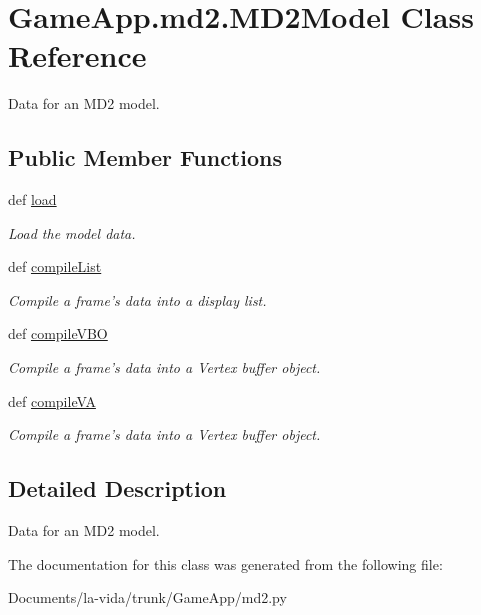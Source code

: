 \hypertarget{classGameApp_1_1md2_1_1MD2Model}{
\section{GameApp.md2.MD2Model Class Reference}
\label{classGameApp_1_1md2_1_1MD2Model}
}
Data for an MD2 model.  


\subsection*{Public Member Functions}
\begin{CompactItemize}
\item 
\hypertarget{classGameApp_1_1md2_1_1MD2Model_d5424ec6f9096eec0f6a65f6b200890d}{
def \hyperlink{classGameApp_1_1md2_1_1MD2Model_d5424ec6f9096eec0f6a65f6b200890d}{load}}
\label{classGameApp_1_1md2_1_1MD2Model_d5424ec6f9096eec0f6a65f6b200890d}

\begin{CompactList}\small\item\em Load the model data. \item\end{CompactList}\item 
\hypertarget{classGameApp_1_1md2_1_1MD2Model_42826a5b1300b880e0676003158ebd44}{
def \hyperlink{classGameApp_1_1md2_1_1MD2Model_42826a5b1300b880e0676003158ebd44}{compileList}}
\label{classGameApp_1_1md2_1_1MD2Model_42826a5b1300b880e0676003158ebd44}

\begin{CompactList}\small\item\em Compile a frame's data into a display list. \item\end{CompactList}\item 
\hypertarget{classGameApp_1_1md2_1_1MD2Model_6e52ed170fd7707c3ad8c5228f9127fb}{
def \hyperlink{classGameApp_1_1md2_1_1MD2Model_6e52ed170fd7707c3ad8c5228f9127fb}{compileVBO}}
\label{classGameApp_1_1md2_1_1MD2Model_6e52ed170fd7707c3ad8c5228f9127fb}

\begin{CompactList}\small\item\em Compile a frame's data into a Vertex buffer object. \item\end{CompactList}\item 
\hypertarget{classGameApp_1_1md2_1_1MD2Model_cc0ea2f6403496a1742472528bafb773}{
def \hyperlink{classGameApp_1_1md2_1_1MD2Model_cc0ea2f6403496a1742472528bafb773}{compileVA}}
\label{classGameApp_1_1md2_1_1MD2Model_cc0ea2f6403496a1742472528bafb773}

\begin{CompactList}\small\item\em Compile a frame's data into a Vertex buffer object. \item\end{CompactList}\end{CompactItemize}


\subsection{Detailed Description}
Data for an MD2 model. 

The documentation for this class was generated from the following file:\begin{CompactItemize}
\item 
Documents/la-vida/trunk/GameApp/md2.py\end{CompactItemize}
